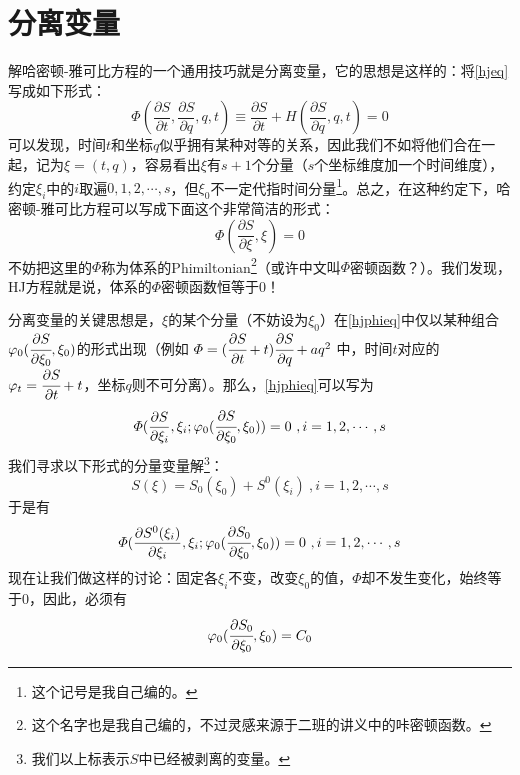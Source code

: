 \documentclass{ctexart}
\begin{document}
\section{分离变量}
解哈密顿-雅可比方程的一个通用技巧就是分离变量，它的思想是这样的：将\cref{hjeq}写成如下形式：
\begin{equation}
\varPhi (\frac{\partial S}{\partial t} , \frac{\partial S}{\partial q} , q ,t) \equiv \frac{\partial S}{\partial t} + H(\frac{\partial S}{\partial q},q,t) = 0
\end{equation}
可以发现，时间$t$和坐标$q$似乎拥有某种对等的关系，因此我们不如将他们合在一起，记为$\xi = (t,q)$，容易看出$\xi$有$s+1$个分量（$s$个坐标维度加一个时间维度），约定$\xi_i$中的$i$取遍$0,1,2,\cdots,s$，但$\xi_0$不一定代指时间分量\footnote{这个记号是我自己编的。}。总之，在这种约定下，哈密顿-雅可比方程可以写成下面这个非常简洁的形式：
\begin{equation} \label{hjphieq}
\varPhi (\frac{\partial S}{\partial \xi},\xi) = 0
\end{equation}
不妨把这里的$\varPhi$称为体系的Phimiltonian\footnote{这个名字也是我自己编的，不过灵感来源于二班的讲义中的咔密顿函数。}（或许中文叫$\Phi$密顿函数？）。我们发现，HJ方程就是说，体系的$\Phi$密顿函数恒等于0！\par
分离变量的关键思想是，$\xi$的某个分量（不妨设为$\xi_0$）在\cref{hjphieq}中仅以某种组合$\varphi_0(\cfrac{\partial S}{\partial \xi_0},\xi_0)$的形式出现（例如
$\varPhi = (\cfrac{\partial S}{\partial t} + t)\cfrac{\partial S}{\partial q} + aq^2$
中，时间$t$对应的$\varphi_t = \cfrac{\partial S}{\partial t} + t$，坐标$q$则不可分离）。那么，\cref{hjphieq}可以写为
\begin{equation}
\varPhi (\frac{\partial S}{\partial \xi_i},\xi_i;\varphi_0(\cfrac{\partial S}{\partial \xi_0},\xi_0)) = 0\ , i = 1,2,\cdots,s
\end{equation}
我们寻求以下形式的分量变量解\footnote{我们以上标表示$S$中已经被剥离的变量。}：
\begin{equation}
S(\xi) = S_0(\xi_0) + S^0(\xi_i)\ , i = 1,2,\cdots,s
\end{equation}
于是有
\begin{equation}
\varPhi (\frac{\partial S^0(\xi_i)}{\partial \xi_i},\xi_i;\varphi_0(\cfrac{\partial S_0}{\partial \xi_0},\xi_0)) = 0\ , i = 1,2,\cdots,s
\end{equation}
现在让我们做这样的讨论：固定各$\xi_i$不变，改变$\xi_0$的值，$\varPhi$却不发生变化，始终等于0，因此，必须有
\begin{equation} \label{const0}
\varphi_0 (\cfrac{\partial S_0}{\partial \xi_0},\xi_0) = C_0
\end{equation}
\end{document}
